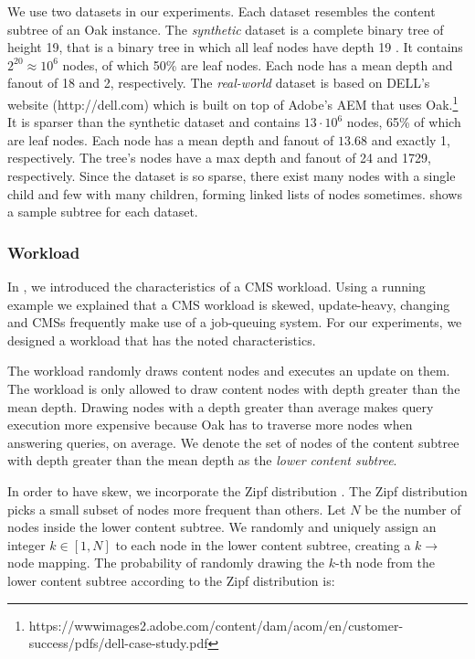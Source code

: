 \documentclass[abstracton,12pt]{scrartcl}
\theoremstyle{definition}
\begin{document}
We use two datasets in our experiments. Each dataset resembles the content
subtree of an Oak instance. The \textit{synthetic} dataset is a complete binary
tree of height 19, that is a binary tree in which all leaf nodes have depth 19
\cite{Cormen-complete-kary-tree}. It contains $2^{20} \approx 10^6$ nodes, of which 50\% are leaf
nodes. Each node has a mean depth and fanout of 18 and 2, respectively. The
\textit{real-world} dataset is based on DELL's website (http://dell.com)
which is built on top of Adobe's AEM that uses Oak.\footnote{https://wwwimages2.adobe.com/content/dam/acom/en/customer-success/pdfs/dell-case-study.pdf}
It is sparser than the synthetic dataset and contains $13 \cdot 10^6$
nodes, 65\% of which are leaf nodes. Each node has a mean depth and fanout of
$13.68$ and exactly 1, respectively. The tree's nodes have a max depth and fanout of 24
and 1729, respectively. Since the dataset is so sparse, there exist many nodes with 
a single child and few with many children, forming linked lists \cite{Cormen-linked-list} 
of nodes sometimes.  shows a sample subtree for each dataset.

\subsubsection{Workload}

\label{sec:workload}

In , we introduced the characteristics of a CMS
workload. Using a running example we explained that a CMS workload is skewed,
update-heavy, changing and CMSs frequently make use of a job-queuing system.
For our experiments, we designed a workload that has the noted characteristics.

The workload randomly draws content nodes and executes an update on them.
The workload is only allowed to draw content nodes with depth greater than
the mean depth. Drawing nodes with a depth greater than average makes query
execution more expensive because Oak has to traverse more nodes when answering
queries, on average. We denote the set of nodes of the content subtree with
depth greater than the mean depth as the \textit{lower content subtree}.

In order to have skew, we incorporate the Zipf distribution \cite{zipf}. The Zipf
distribution picks a small subset of nodes more frequent than others. 
Let $N$ be the number of nodes inside the lower content subtree.
We randomly and uniquely assign an integer $k \in [1, N]$ to each node in the
lower content subtree, creating 
a $k \rightarrow$ node mapping. The probability of randomly drawing the $k$-th node 
from the lower content subtree according to the Zipf distribution is:
\end{document}
